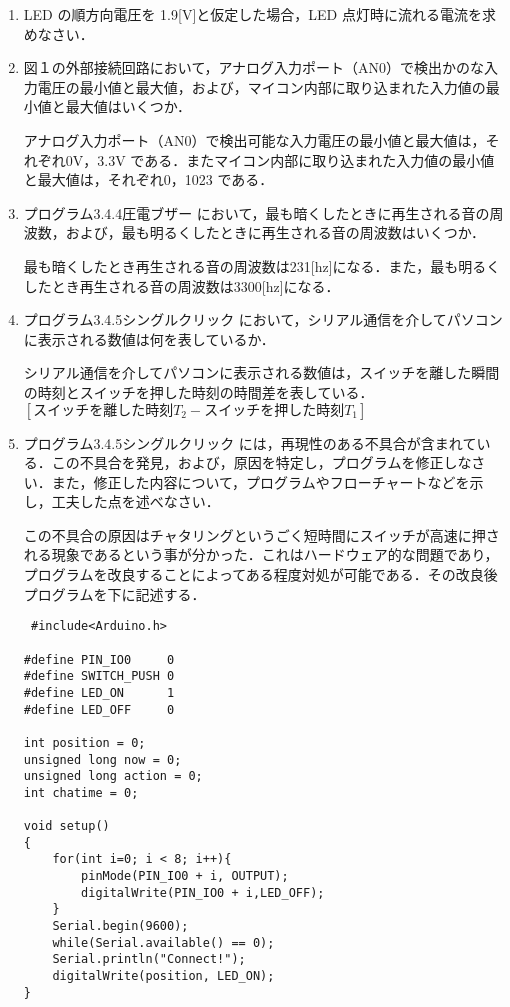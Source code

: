 \documentclass {ujarticle}
\begin{document}
 \begin{enumerate}
 \item LED の順方向電圧を 1.9[V]と仮定した場合，LED 点灯時に流れる電流を求めなさい．
 
 \item 図１の外部接続回路において，アナログ入力ポート（AN0）で検出かのな入力電圧の最小値と最大値，および，マイコン内部に取り込まれた入力値の最小値と最大値はいくつか．
 
 アナログ入力ポート（AN0）で検出可能な入力電圧の最小値と最大値は，それぞれ0V，3.3V である．またマイコン内部に取り込まれた入力値の最小値と最大値は，それぞれ0，1023 である．
 
 \item プログラム3.4.4圧電ブザー において，最も暗くしたときに再生される音の周波数，および，最も明るくしたときに再生される音の周波数はいくつか．
 
  最も暗くしたとき再生される音の周波数は231[hz]になる．また，最も明るくしたとき再生される音の周波数は3300[hz]になる．
 
 \item プログラム3.4.5シングルクリック において，シリアル通信を介してパソコンに表示される数値は何を表しているか．
 
  シリアル通信を介してパソコンに表示される数値は，スイッチを離した瞬間の時刻とスイッチを押した時刻の時間差を表している．
 $[スイッチを離した時刻T_{2} - スイッチを押した時刻T_{1}]$
 
 \item プログラム3.4.5シングルクリック には，再現性のある不具合が含まれている．この不具合を発見，および，原因を特定し，プログラムを修正しなさい．また，修正した内容について，プログラムやフローチャートなどを示し，工夫した点を述べなさい．
 
  この不具合の原因はチャタリングというごく短時間にスイッチが高速に押される現象であるという事が分かった．これはハードウェア的な問題であり，プログラムを改良することによってある程度対処が可能である．その改良後プログラムを下に記述する．
 
 \begin{lstlisting}
 #include<Arduino.h>

#define PIN_IO0		0
#define	SWITCH_PUSH	0
#define LED_ON		1
#define LED_OFF		0

int position = 0;
unsigned long now = 0;
unsigned long action = 0;
int chatime = 0;

void setup()
{
	for(int i=0; i < 8; i++){
		pinMode(PIN_IO0 + i, OUTPUT);
		digitalWrite(PIN_IO0 + i,LED_OFF);
	}
	Serial.begin(9600);
	while(Serial.available() == 0);
	Serial.println("Connect!");
	digitalWrite(position, LED_ON);
}


\end{lstlisting}
\end{enumerate}
\end{document}
